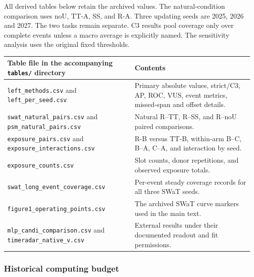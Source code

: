 \documentclass[11pt]{article}
\begin{document}
All derived tables below retain the archived values. The
natural-condition comparison uses noU, TT-A, SS, and R-A. Three updating
seeds are 2025, 2026 and 2027. The two tasks remain separate. C3 results
pool coverage only over complete events unless a macro average is
explicitly named. The sensitivity analysis uses the original fixed
thresholds.

\begin{longtable}[]{@{}
  >{\raggedright\arraybackslash}p{}
  >{\raggedright\arraybackslash}p{}@{}}
\toprule\noalign{}
\begin{minipage}[b]{\linewidth}\raggedright
Table file in the accompanying \texttt{tables/} directory
\end{minipage} & \begin{minipage}[b]{\linewidth}\raggedright
Contents
\end{minipage} \\
\midrule\noalign{}
\endhead
\bottomrule\noalign{}
\endlastfoot
\texttt{left\_methods.csv} and \texttt{left\_per\_seed.csv} & Primary
absolute values, strict/C3, AP, ROC, VUS, event metrics, missed-span and
offset details. \\
\texttt{swat\_natural\_pairs.csv} and \texttt{psm\_natural\_pairs.csv} &
Natural R--TT, R--SS, and R--noU paired comparisons. \\
\texttt{exposure\_pairs.csv} and \texttt{exposure\_interactions.csv} &
R-B versus TT-B, within-arm B--C, B--A, C--A, and interaction by
seed. \\
\texttt{exposure\_counts.csv} & Slot counts, donor repetitions, and
observed exposure totals. \\
\texttt{swat\_long\_event\_coverage.csv} & Per-event steady coverage
records for all three SWaT seeds. \\
\texttt{figure1\_operating\_points.csv} & The archived SWaT curve
markers used in the main text. \\
\texttt{mlp\_candi\_comparison.csv} and
\texttt{timeradar\_native\_v.csv} & External results under their
documented readout and fit permissions. \\
\end{longtable}

\subsubsection{Historical computing
budget}\label{historical-computing-budget}
\end{document}
